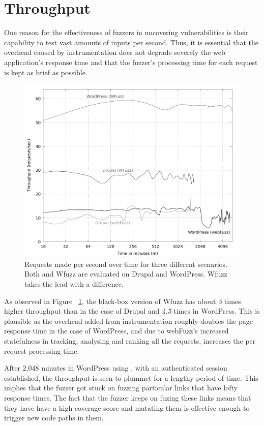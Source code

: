 \section{Throughput}
One reason for the effectiveness of fuzzers in uncovering vulnerabilities is their capability to test vast amounts of inputs per second. Thus, it is essential that the overhead caused by instrumentation does not degrade severely the web application's response time and that the fuzzer's processing time for each request is kept as brief as possible.

\begin{figure}[!htb]
  \centering \includegraphics[width=\linewidth]{figures/plot_throughput.pdf}
  \caption{Requests made per second over time for three different scenarios. Both \pname{} and Wfuzz are evaluated on Drupal and WordPress. Wfuzz takes the lead with a difference.} 
  \label{fig:plot_throughput}
\end{figure}

As observed in Figure ~\ref{fig:plot_throughput}, the black-box version of Wfuzz has about \emph{3} times higher throughput than \pname{} in the case of Drupal and \emph{4.5} times in WordPress. This is plausible as the overhead added from instrumentation roughly doubles the page response time in the case of WordPress, and due to webFuzz's increased statefulness in tracking, analysing and ranking all the requests, increases the per request processing time.

After 2,048 minutes in WordPress using \pname{}, with an authenticated session established, the throughput is seen to plummet for a lengthy period of time. This implies that the fuzzer got stuck on fuzzing particular links that have lofty response times. The fact that the fuzzer keeps on fuzing these links means that they have have a high coverage score and mutating them is effective enough to trigger new code paths in them.

